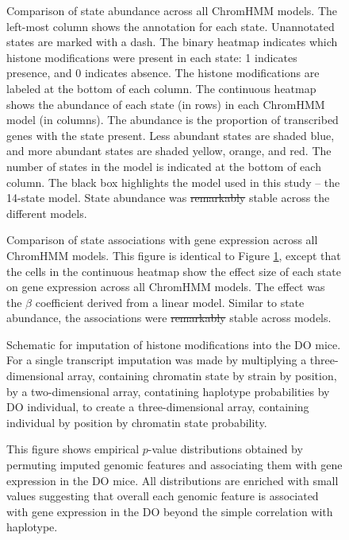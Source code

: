 \documentclass[
  11pt,
]{article}
\providecommand{\DIFdeltex}[1]{{\protect\color{red}\sout{#1}}}                      %
\providecommand{\DIFdelFL}[1]{\DIFdel{#1}} %
\providecommand{\DIFdelbeginFL}{} %
\providecommand{\DIFdelendFL}{} %
\providecommand{\DIFdel}[1]{\texorpdfstring{\DIFdeltex{#1}}{}} %
\newcommand{\DIFscaledelfig}{0.5}
\newlength{\DIFdelgraphicswidth} %
\newlength{\DIFdelgraphicsheight} %
\newcommand{\DIFdelincludegraphics}[2][]{%
\sbox{\DIFdelgraphicsbox}{\DIFOincludegraphics[#1]{#2}}%
\settoboxwidth{\DIFdelgraphicswidth}{\DIFdelgraphicsbox} %
\settoboxtotalheight{\DIFdelgraphicsheight}{\DIFdelgraphicsbox} %
\scalebox{\DIFscaledelfig}{%
\parbox[b]{\DIFdelgraphicswidth}{\usebox{\DIFdelgraphicsbox}\\[-\baselineskip] \rule{\DIFdelgraphicswidth}{0em}}\llap{\resizebox{\DIFdelgraphicswidth}{\DIFdelgraphicsheight}{%
\setlength{\unitlength}{\DIFdelgraphicswidth}%
\begin{picture}(1,1)%
\thicklines\linethickness{2pt} %
{\color[rgb]{1,0,0}\put(0,0){\framebox(1,1){}}}%
{\color[rgb]{1,0,0}\put(0,0){\line( 1,1){1}}}%
{\color[rgb]{1,0,0}\put(0,1){\line(1,-1){1}}}%
\end{picture}%
}\hspace*{3pt}}} %
} %
\DeclareRobustCommand{\DIFdelbeginFL}{\DIFOdelbeginFL \let\includegraphics\DIFdelincludegraphics} %
\DeclareRobustCommand{\DIFdelendFL}{\DIFOaddendFL \let\includegraphics\DIFOincludegraphics} %
\begin{document}
\begin{figure}[ht!]
\caption{Comparison of state abundance across all ChromHMM models. The left-most column
shows the annotation for each state. Unannotated states are marked with a dash. The 
binary heatmap indicates which histone modifications were present in each state: 1 
indicates presence, and 0 indicates absence. The histone modifications are labeled
at the bottom of each column. The continuous heatmap shows the abundance of each state
(in rows) in each ChromHMM model (in columns). The abundance is the proportion of 
transcribed genes with the state present. Less abundant states are shaded blue, and 
more abundant states are shaded yellow, orange, and red. The number of states in the
model is indicated at the bottom of each column. The black box highlights the model
used in this study -- the 14-state model. State abundance was
\DIFdelbeginFL \DIFdelFL{remarkably
}\DIFdelendFL stable across the different models.}
\label{supp_fig:model_abundance_comparison}
\end{figure}

\begin{figure}[ht!]
\caption{Comparison of state associations with gene expression across all 
ChromHMM models. This figure is identical to Figure 
\ref{supp_fig:model_abundance_comparison}, except that the cells in the 
continuous heatmap show the effect size of each state on gene expression
across all ChromHMM models. The effect was the $\beta$ coefficient derived from
a linear model. Similar to state abundance, the associations were 
\DIFdelbeginFL \DIFdelFL{remarkably 
}\DIFdelendFL stable across models.}
\label{supp_fig:model_effect_comparison}
\end{figure}

\begin{figure}[ht!]
\caption{Schematic for imputation of histone modifications into the 
DO mice. For a single transcript imputation was made by multiplying 
a three-dimensional array, containing chromatin state by strain by
position, by a two-dimensional array, contatining haplotype probabilities
by DO individual, to create a three-dimensional array, containing 
individual by position by chromatin state probability.}
\label{supp_fig:imputation}
\end{figure}

\begin{figure}[ht!]
\caption{This figure shows empirical $p$-value distributions obtained
by permuting imputed genomic features and associating them
with gene expression in the DO mice. All distributions are
enriched with small values suggesting that overall each 
genomic feature   is associated with gene expression in the DO
beyond the simple correlation with haplotype.
}
\label{supp_fig:empirical_p}
\end{figure}

\pagebreak


\end{document}
